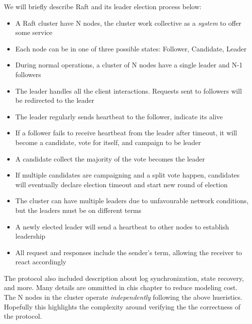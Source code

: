 \documentclass{report}
\begin{document}
We will briefly describe Raft and its leader election process below: 
\begin{itemize}
    \item A Raft cluster have N nodes, the cluster work collective as a
    \textit{system} to offer some service
    \item Each node can be in one of three possible states: Follower, Candidate, Leader
    \item During normal operations, a cluster of N nodes have a single leader
    and N-1 followers
    \item The leader handles all the client interactions. Requests sent to followers will be 
    redirected to the leader
    \item The leader regularly sends heartbeat to the follower, indicate its
    alive
    \item If a follower fails to receive heartbeat from the leader after
    timeout, it will become a candidate, vote for itself, and campaign to be
    leader
    \item A candidate collect the majority of the vote becomes the leader
    \item If multiple candidates are campaigning and a split vote happen,
    candidates will eventually declare election timeout and start new round of
    election
    \item The cluster can have multiple leaders due to unfavourable network conditions, 
    but the leaders must be on different terms 
    \item A newly elected leader will send a heartbeat to other nodes to establish 
    leadership 
    \item All request and responses include the sender's term, allowing the
    receiver to react accordingly
\end{itemize}

The protocol also included description about log synchronization, state
recovery, and more. Many details are ommitted in chis chapter to reduce modeling
cost. The N nodes in the cluster operate \textit{independently} following the
above hueristics. Hopefully this highlights the complexity around verifying the
the correctness of the protocol.\newline
\end{document}
